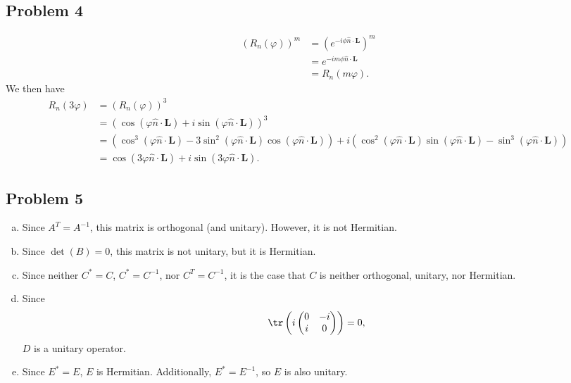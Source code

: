 \documentclass[10pt]{mypackage}
\begin{document}
\subsection{Problem 4}%
\begin{align*}
  \left(R_n\left(\varphi\right)\right)^m &= \left(e^{-i\phi\hat{n}\cdot \mathbf{L}}\right)^m\\
                                         &= e^{-im\phi \hat{n}\cdot \mathbf{L}}\\
                                         &= R_{n}\left(m\varphi\right).
\end{align*}
We then have
\begin{align*}
  R_n\left(3\varphi\right) &= \left(R_n\left(\varphi\right)\right)^{3}\\
                           &= \left(\cos\left(\varphi \hat{n}\cdot \mathbf{L}\right) + i\sin\left(\varphi\hat{n}\cdot \mathbf{L}\right)\right)^3\\
                           &= \left(\cos^3\left(\varphi \hat{n}\cdot \mathbf{L}\right) - 3\sin^2\left(\varphi \hat{n}\cdot \mathbf{L}\right)\cos\left(\varphi\hat{n}\cdot \mathbf{L}\right)\right) + i\left(\cos^2\left(\varphi\hat{n}\cdot \mathbf{L}\right)\sin\left(\varphi\hat{n}\cdot \mathbf{L}\right) - \sin^3\left(\varphi\hat{n}\cdot \mathbf{L}\right)\right)\\
                           &= \cos\left(3\varphi\hat{n}\cdot \mathbf{L}\right) + i\sin\left(3\varphi\hat{n}\cdot \mathbf{L}\right).
\end{align*}
\subsection{Problem 5}%
\begin{enumerate}[(a)]
  \item Since $A^{T} = A^{-1}$, this matrix is orthogonal (and unitary). However, it is not Hermitian.
  \item Since $\det(B) =0$, this matrix is not unitary, but it is Hermitian.
  \item Since neither $C^{\ast} = C$, $C^{\ast} = C^{-1}$, nor $C^{T} = C^{-1}$, it is the case that $C$ is neither orthogonal, unitary, nor Hermitian.
  \item Since
    \begin{align*}
      \tr\left(i \begin{pmatrix}0 & -i \\ i & 0\end{pmatrix}\right) = 0,
    \end{align*}
    $D$ is a unitary operator.
  \item Since $E^{\ast} = E$, $E$ is Hermitian. Additionally, $E^{\ast} = E^{-1}$, so $E$ is also unitary.
\end{enumerate}
\end{document}

